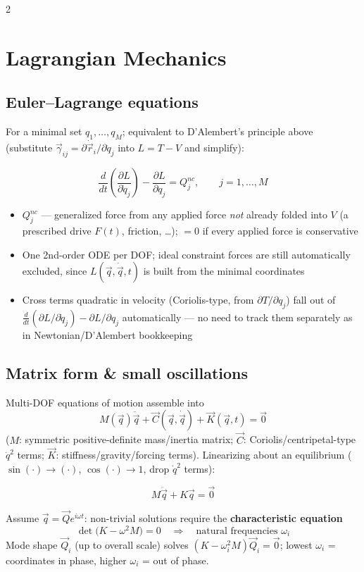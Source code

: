 \documentclass[10pt]{article}
\begin{document}
\begin{multicols}{2}
\section*{Lagrangian Mechanics}
\subsection*{Euler--Lagrange equations}
For a minimal set $q_1,\dots,q_M$; equivalent to D'Alembert's principle above (substitute $\vec\gamma_{ij}=\partial\dot{\vec r}_i/\partial\dot q_j$ into $L=T-V$ and simplify):
\begin{keybox}
\[
    \frac{d}{dt}\left(\frac{\partial L}{\partial\dot q_j}\right) - \frac{\partial L}{\partial q_j} = Q_j^{nc}, \qquad j=1,\dots,M
\]
\end{keybox}
\begin{itemize}[nosep, leftmargin=1.1em]
    \item $Q_j^{nc}$ --- generalized force from any applied force \emph{not} already folded into $V$ (a prescribed drive $F(t)$, friction, \dots); $=0$ if every applied force is conservative
    \item One 2nd-order ODE per DOF; ideal constraint forces are still automatically excluded, since $L(\vec q,\dot{\vec q},t)$ is built from the minimal coordinates
    \item Cross terms quadratic in velocity (Coriolis-type, from $\partial T/\partial q_j$) fall out of $\tfrac{d}{dt}(\partial L/\partial\dot q_j)-\partial L/\partial q_j$ automatically --- no need to track them separately as in Newtonian/D'Alembert bookkeeping
\end{itemize}

\subsection*{Matrix form \& small oscillations}
Multi-DOF equations of motion assemble into
\[
    M(\vec q)\ddot{\vec q} + \vec C(\vec q,\dot{\vec q}) + \vec K(\vec q,t) = \vec 0
\]
($M$: symmetric positive-definite mass/inertia matrix; $\vec C$: Coriolis/centripetal-type $\dot q^2$ terms; $\vec K$: stiffness/gravity/forcing terms). Linearizing about an equilibrium ($\sin(\cdot)\to(\cdot)$, $\cos(\cdot)\to1$, drop $\dot q^2$ terms):
\begin{keybox}
\[
    M\ddot{\vec q} + K\vec q = \vec 0
\]
\end{keybox}
Assume $\vec q=\vec Qe^{i\omega t}$: non-trivial solutions require the \textbf{characteristic equation}
\[
    \det\!\big(K-\omega^{2}M\big)=0 \quad\Rightarrow\quad \text{natural frequencies }\omega_i
\]
Mode shape $\vec Q_i$ (up to overall scale) solves $(K-\omega_i^2M)\vec Q_i=\vec 0$; lowest $\omega_i$ = coordinates in phase, higher $\omega_i$ = out of phase.


\end{multicols}
\end{document}
